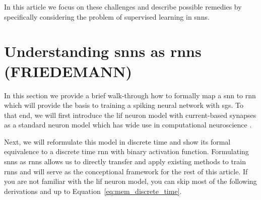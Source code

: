 \documentclass[journal,onecolumn,11pt]{IEEEtran}
\begin{document}
In this article we focus on these challenges and describe possible remedies by specifically considering the problem of supervised learning in \glspl{snn}.
%
%
%
%
%

\section{Understanding \glspl{snn} as \glspl{rnn} (FRIEDEMANN)}
\label{sec:understanding_ssn_as_rnn}

In this section we provide a brief walk-through how to formally map a \gls{snn} to \gls{rnn} 
which will provide the basis to training a spiking neural network with \glspl{sg}.
To that end, we will first introduce the \gls{lif} neuron model
with current-based synapses as 
a standard neuron model which has wide use in computational neuroscience \cite{Gerstner_etal14_neurdyna}.

Next, we will reformulate this model in discrete time and show its formal equivalence to a discrete time \gls{rnn} with binary activation function. 
Formulating \glspl{snn} as \glspl{rnn} 
allows us to directly transfer and apply existing methods to train \glspl{rnn} and will serve as the conceptional framework for the rest of this article. 
If you are not familiar with the \gls{lif} neuron model, you can skip most of the following derivations and up to Equation~\eqref{eq:mem_discrete_time}. 
\end{document}

